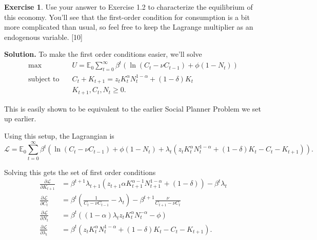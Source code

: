 \documentclass[11pt]{article}
\numberwithin{equation}{section} %
\numberwithin{figure}{section} %
\numberwithin{table}{section} %
\theoremstyle{definition}
\newtheorem{exercise}[theorem]{Exercise}
\newenvironment{solution}{\begin{addmargin}[2em]{0em} {\bf Solution. }}{\end{addmargin}}
\newcommand{\E}{\mathbb{E}}
\newcommand{\lagr}{\mathcal{L}}
\begin{document}
\begin{exercise}
    Use your answer to Exercise 1.2 to characterize the equilibrium of this economy. You'll see that the first-order condition for consumption is a bit more complicated than usual, so feel free to keep the Lagrange multiplier as an endogenous variable. [10]
\end{exercise}

\begin{solution}
    To make the first order conditions easier, we'll solve
    \begin{alignat*}{4}
        \text{max} \quad & U = \E_0 \sum_{t=0}^\infty \beta^t \left(\ln \left(C_t - \nu C_{t-1}\right) + \phi \left(1 - N_t\right)\right) \\
        \text{subject to} \quad & C_t + K_{t + 1} = z_t K_t^\alpha N_t^{1 - \alpha} + (1 - \delta)K_t \\
        & K_{t+1}, C_t, N_t \geq 0.
    \end{alignat*}

    This is easily shown to be equivalent to the earlier Social Planner Problem we set up earlier.

    Using this setup, the Lagrangian is
    \[
        \lagr = \E_0 \sum_{t=0}^\infty \beta^t \left( \ln \left(C_t - \nu C_{t-1}\right) + \phi \left(1 - N_t\right) + \lambda_t\left(z_t K_t^\alpha N_t^{1 - \alpha} + (1 - \delta)K_t - C_t - K_{t + 1}\right)\right).
    \]

    Solving this gets the set of first order conditions
    \begin{align*}
        \frac{\partial \lagr}{\partial K_{t+1}} &= \beta^{t+1} \lambda_{t+1} \left(z_{t+1} \alpha K_{t+1}^{\alpha-1} N_{t+1}^{1-\alpha} + (1 - \delta)\right) - \beta^t \lambda_t \\
        \frac{\partial \lagr}{\partial C_t} &= \beta^t \left(\frac{1}{C_t - \nu C_{t-1}} - \lambda_t\right) - \beta^{t+1} \frac{\nu}{C_{t+1} - \nu C_t} \\
        \frac{\partial \lagr}{\partial N_t} &= \beta^t \left((1-\alpha) \lambda_t z_t K_t^\alpha N_t^{-\alpha}-\phi \right) \\
        \frac{\partial \lagr}{\partial \lambda_t} &= \beta^t \left(z_t K_t^\alpha N_t^{1 - \alpha} + (1 - \delta)K_t - C_t - K_{t + 1}\right).
    \end{align*}


\end{solution}
\end{document}
